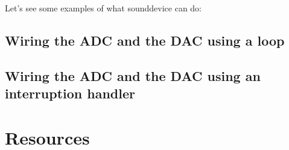 Let's see some examples of what sounddevice can do:

\subsection*{Wiring the ADC and the DAC using a loop}


\subsection*{Wiring the ADC and the DAC using an interruption handler}


\section{Resources}


